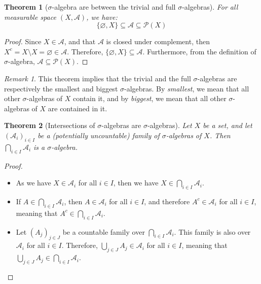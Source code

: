 \documentclass{article}
\newtheorem{theorem}{Theorem}[section]
\theoremstyle{definition}
\theoremstyle{remark}
\newtheorem*{remark}{Remark}
\theoremstyle{example}
\theoremstyle{notation}
\theoremstyle{axiom}
\begin{document}
\begin{theorem}[$\sigma$-algebra are between the trivial and full $\sigma$-algebras]
    For all measurable space $(X, \mathcal{A})$, we have:
        $$\{\varnothing, X\} \subseteq \mathcal{A} \subseteq \mathcal{P}(X)$$
\end{theorem}

\begin{proof}
    Since $X \in \mathcal{A}$, and that $\mathcal{A}$ is closed under complement, then $X^c = X \setminus X = \varnothing \in \mathcal{A}$. Therefore, $\{\varnothing, X\} \subseteq \mathcal{A}$. Furthermore, from the definition of $\sigma$-algebra, $\mathcal{A} \subseteq \mathcal{P}(X)$. 
\end{proof}

\begin{remark}
    This theorem implies that the trivial and the full $\sigma$-algebras are respectively the smallest and biggest $\sigma$-algebras. By \textit{smallest}, we mean that all other $\sigma$-algebras of $X$ contain it, and by \textit{biggest}, we mean that all other $\sigma$-algebras of $X$ are contained in it.
\end{remark}

\begin{theorem}[Intersections of $\sigma$-algebras are $\sigma$-algebras]
    Let $X$ be a set, and let $(\mathcal{A}_i)_{i \in I}$ be a (potentially uncountable) family of $\sigma$-algebras of $X$. Then $\bigcap_{i \in I} \mathcal{A}_i$ is a $\sigma$-algebra.
\end{theorem}

\begin{proof}~
    \begin{itemize}
        \item As we have $X \in \mathcal{A}_i$ for all $i \in I$, then we have $X \in \bigcap_{i \in I} \mathcal{A}_i$.
        \item If $A \in \bigcap_{i \in I} \mathcal{A}_i$, then $A \in \mathcal{A}_i$ for all $i \in I$, and therefore $A^c \in \mathcal{A}_i$ for all $i \in I$, meaning that $A^c \in \bigcap_{i \in I} \mathcal{A}_i$.
        \item Let $(A_j)_{j \in J}$ be a countable family over $\bigcap_{i \in I} \mathcal{A}_i$. This family is also over $\mathcal{A}_i$ for all $i \in I$. Therefore, $\bigcup_{j \in J} A_j \in \mathcal{A}_i$ for all $i \in I$, meaning that $\bigcup_{j \in J} A_j \in \bigcap_{i \in I} \mathcal{A}_i$.
    \end{itemize}
\end{proof}
\end{document}
